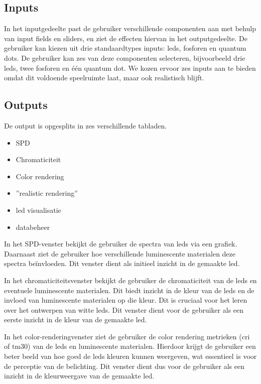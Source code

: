 \subsection{Inputs}

In het inputgedeelte past de gebruiker verschillende componenten aan met behulp van input fields en sliders, en ziet de effecten hiervan in het outputgedeelte. De gebruiker kan kiezen uit drie standaardtypes inputs: \gls{led}s, fosforen en quantum dots. De gebruiker kan zes van deze componenten selecteren, bijvoorbeeld drie \gls{led}s, twee fosforen en \'e\'en quantum dot. We kozen ervoor zes inputs aan te bieden omdat dit voldoende speelruimte laat, maar ook realistisch blijft.

\subsection{Outputs}

De output is opgesplits in zes verschillende tabladen.

\begin{itemize}
    \item SPD
    \item Chromaticiteit
    \item Color rendering
    \item ''realistic rendering''
    \item led visualisatie
    \item databeheer
\end{itemize}

In het SPD-venster bekijkt de gebruiker de spectra van \gls{led}s via een grafiek. Daarnaast ziet de gebruiker hoe verschillende luminescente materialen deze spectra be\"invloeden. Dit venster dient als initieel inzicht in de gemaakte \gls{led}.

In het chromaticiteitsvenster bekijkt de gebruiker de chromaticiteit van de \gls{led}s en eventuele luminescente materialen. Dit biedt inzicht in de kleur van de \gls{led}s en de invloed van luminescente materialen op die kleur. Dit is cruciaal voor het leren over het ontwerpen van witte \gls{led}s. Dit venster dient voor de gebruiker als een eerste inzicht in de kleur van de gemaakte \gls{led}.

In het color-renderingvenster ziet de gebruiker de color rendering metrieken (\gls{cri} of tm30) van de \gls{led}s en luminescente materialen. Hierdoor krijgt de gebruiker een beter beeld van hoe goed de \gls{led}s kleuren kunnen weergeven, wat essentieel is voor de perceptie van de belichting. Dit venster dient dus voor de gebruiker als een inzicht in de kleurweergave van de gemaakte \gls{led}.

